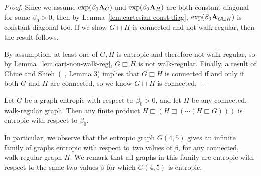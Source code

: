 \begin{proof}
  Since we assume $\exp(\beta_0 \textbf{A}_{G})$ and $\exp(\beta_0 \textbf{A}_H)$ are both constant diagonal for some $\beta_0 > 0$, then by Lemma~\ref{lem:cartesian-const-diag}, $\exp(\beta_0 \textbf{A}_{G\Box H})$ is constant diagonal too. If we show $G \Box H$ is connected and not walk-regular, then the result follows.

  By assumption, at least one of $G, H$ is entropic and therefore not walk-regular, so by Lemma~\ref{lem:cart-non-walk-reg}, $G \Box H$ is not walk-regular.
  Finally, a result of Chiue and Shieh~(~\cite{chiue1999connectivity}, Lemma 3) implies that $G \Box H$ is connected if and only if both $G$ and $H$ are connected, so we know $G \Box H$ is connected.
\end{proof}
\begin{corollary}\label{cor:cartesian-infinite}
    Let $G$ be a graph entropic with respect to $\beta_0 > 0$, and let $H$ be any connected, walk-regular graph. Then any finite product $H \Box (H \Box ( \cdots (H \Box G)))$ is entropic with respect to $\beta_0$.
\end{corollary}
In particular, we observe that the entropic graph $G(4,5)$ gives an infinite family of graphs entropic with respect to two values of $\beta$, for any connected, walk-regular graph $H$.
We remark that all graphs in this family are entropic with respect to the same two values $\beta$ for which $G(4,5)$ is entropic.
